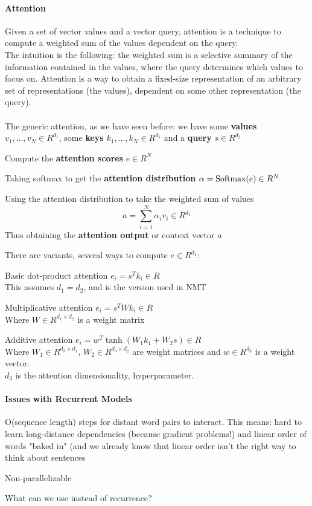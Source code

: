 \documentclass[10pt]{report}
\begin{document}
\paragraph{Attention} Given a set of vector values and a vector query, attention is a technique to compute a weighted sum of the values dependent on the query.\\
The intuition is the following: the weighted sum is a selective summary of the information contained in the values, where the query determines which values to focus on. Attention is a way to obtain a fixed-size representation of an arbitrary set of representations (the values), dependent on some other representation (the query).\\\\
The generic attention, as we have seen before: we have some \textbf{values} $v_1,\ldots,v_N\in R^{d_1}$, some \textbf{keys} $k_1,\ldots,k_N\in R^{d_1}$ and a \textbf{query} $s\in R^{d_2}$\begin{list}{}{}
	\item Compute the \textbf{attention scores} $e\in R^N$
	\item Taking softmax to get the \textbf{attention distribution} $\alpha=\hbox{Softmax}(e)\in R^N$
	\item Using the attention distribution to take the weighted sum of values $$a = \sum_{i=1}^N\alpha_iv_i\in R^{d_1}$$
	Thus obtaining the \textbf{attention output} or context vector $a$
\end{list}
There are variants, several ways to compute $e\in R^{d_1}$:
\begin{list}{}{}
	\item Basic dot-product attention $e_i=s^Tk_i\in R$\\
	This assumes $d_1=d_2$, and is the version used in NMT
	\item Multiplicative attention $e_i=s^TWk_i\in R$\\
	Where $W\in R^{d_1\times d_2}$ is a weight matrix
	\item Additive attention $e_i=w^T\tanh(W_1k_1+W_2s)\in R$\\
	Where $W_1\in R^{d_3\times d_1}$, $W_2\in R^{d_3\times d_2}$ are weight matrices and $w\in R^{d_3}$ is a weight vector.\\$d_3$ is the attention dimensionality, hyperparameter.
\end{list}
\paragraph{Issues with Recurrent Models}\begin{list}{}{}
	\item O(sequence length) steps for distant word pairs to interact. This means: hard to learn long-distance dependencies (because gradient problems!) and linear order of words "baked in" (and we already know that linear order isn't the right way to think about sentences
	\item Non-parallelizable
\end{list}
What can we use instead of recurrence?
\end{document}

